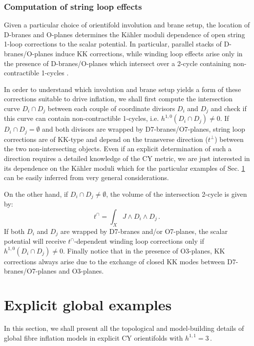 \documentclass[11pt,a4paper]{article}
\newcommand{\be}{\begin{equation}}
\newcommand{\ee}{\end{equation}}
\begin{document}
\subsubsection{Computation of string loop effects}
\label{ComputeLoops}

Given a particular choice of orientifold involution and brane setup, the location of D-branes and O-planes determines the K\"ahler moduli dependence of open string 1-loop corrections to the scalar potential. In particular, parallel stacks of D-branes/O-planes induce KK corrections, while winding loop effects arise only in the presence of D-branes/O-planes which intersect over a 2-cycle containing non-contractible 1-cycles \cite{Berg:2007wt}. 

In order to understand which involution and brane setup yields a form of these corrections suitable to drive inflation, we shall first compute the intersection curve $D_i\cap D_j$ between each couple of coordinate divisors $D_i$ and $D_j$ and check if this curve can contain non-contractible 1-cycles, i.e. $h^{1,0}(D_i\cap D_j)\neq 0$. If $D_i \cap D_j = \emptyset$ and both divisors are wrapped by D7-branes/O7-planes, string loop corrections are of KK-type and depend on the transverse direction ($t^\perp$) between the two non-intersecting objects. Even if an explicit determination of such a direction requires a detailed knowledge of the CY metric, we are just interested in its dependence on the K\"ahler moduli which for the particular examples of Sec. \ref{ExplEx} can be easily inferred from very general considerations. 

On the other hand, if $D_i \cap D_j \neq \emptyset$, the volume of the intersection 2-cycle is given by:
\be
t^\cap = \int_X J \wedge D_i \wedge D_j\,.
\ee
If both $D_i$ and $D_j$ are wrapped by D7-branes and/or O7-planes, the scalar potential will receive $t^\cap$-dependent winding loop corrections only if $h^{1,0}(D_i\cap D_j)\neq 0$. Finally notice that in the presence of O3-planes, KK corrections always arise due to the exchange of closed KK modes between D7-branes/O7-planes and O3-planes.

	
\section{Explicit global examples}
\label{ExplEx}

In this section, we shall present all the topological and model-building details of global fibre inflation models in explicit CY orientifolds with $h^{1,1}=3\,$.
\end{document}
